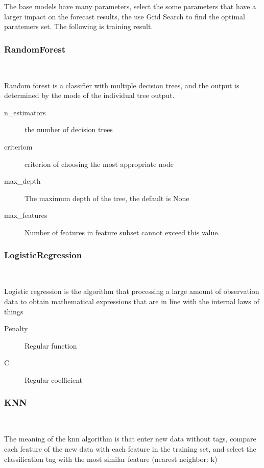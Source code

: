 The base models have many parameters,
select the some parameters that 
have a larger impact on 
the forecast results,
the use Grid Search to find 
the optimal paratemers set.	
The following is training result. 
\subsubsection{RandomForest}
\

Random forest is a classifier with 
multiple decision trees, and
the output is determined by 
the mode of the individual tree output.


\begin{description}
	\item[n_estimators] the number of decision trees
	\item[criteriom] criterion of choosing 
	the most appropriate node
	\item[max_depth] The maximum depth of the tree, 
	the default is None 
	\item[max_features] Number of features in feature subset cannot exceed this value.
\end{description}




\subsubsection{LogisticRegression}
\

Logistic regression is the algorithm that 
processing a large amount of 
observation data to 
obtain mathematical expressions 
that are in line with 
the internal laws of things


\begin{description}
	\item[Penalty] Regular function
	\item[C] Regular coefficient
\end{description}




\subsubsection{KNN}
\

The meaning of the knn algorithm is that 
enter new data without tags, 
compare each feature of the new data with 
each feature in the training set, 
and select the classification tag with 
the most similar feature (nearest neighbor: k)


